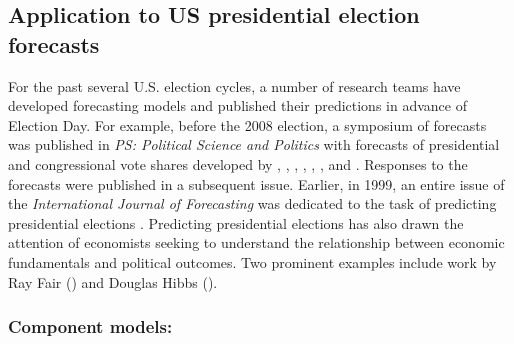 \documentclass[12pt,fullpage,endnotes]{article}
\begin{document}

\subsection{Application to US presidential election forecasts}
For the past several U.S. election cycles, a number of research teams
have developed forecasting models and published their predictions in
advance of Election Day.  For example, before the 2008 election, a
symposium of forecasts was published in \emph{PS: Political Science
  and Politics} with forecasts of presidential and congressional vote
shares developed by \citet{Campbell:2008}, \citet{Norpoth:2008},
\citet{Lewis-Beck:Tien:2008}, \citet{Abramowitz:2008},
\citet{Erikson:Wlezien:2008}, \citet{Holbrook:2008},
\citet{Lockerbie:2008} and \citet{Cuzan:Bundrick:2008}.  Responses to
the forecasts were published in a subsequent issue. Earlier, in 1999,
an entire issue of the \textit{International Journal of Forecasting}
was dedicated to the task of predicting presidential elections
\citep{Brown:1999}.  Predicting presidential elections has also drawn
the attention of economists seeking to understand the relationship
between economic fundamentals and political outcomes.  Two prominent
examples include work by Ray Fair (\citeyear{Fair:2010}) and Douglas
Hibbs (\citeyear{Hibbs:2000}).

\subsubsection{Component models:}
\end{document}
